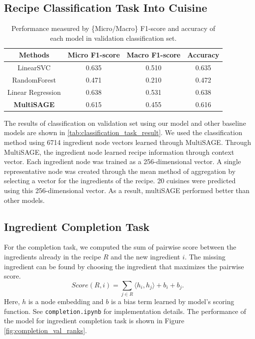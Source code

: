  \subsection{Recipe Classification Task Into Cuisine}
 
 \begin{table}[btp!]
    \centering
    \begin{tabular}{ c c c c }
        \toprule
        \textbf{Methods} & \textbf{Micro F1-score} & \textbf{Macro F1-score} & \textbf{Accuracy} \\
        \midrule
        LinearSVC & 0.635 & 0.510 & 0.635 \\
        RandomForest & 0.471 & 0.210 & 0.472 \\
        Linear Regression & 0.638 & 0.531 & 0.638 \\
        \textbf{MultiSAGE} & 0.615 & 0.455 & 0.616 \\
        \bottomrule
        
    \end{tabular}
    \caption{\label{tab:classification_task_result} Performance measured by \{Micro/Macro\} F1-score and accuracy of each model in validation classification set.}

 \end{table}
 
  The results of classification on validation set using our model and other baseline models are shown in \autoref{tab:classification_task_result}.  
  We used the classification method using 6714 ingredient node vectors learned through MultiSAGE. Through MultiSAGE, the ingredient node learned recipe information through context vector. Each ingredient node was trained as a 256-dimensional vector. A single representative node was created through the mean method of aggregation by selecting a vector for the ingredients of the recipe. 20 cuisines were predicted using this 256-dimensional vector. As a result, multiSAGE performed better than other models.
  
 \subsection{Ingredient Completion Task}
 For the completion task, we computed the sum of pairwise score between the ingredients already in the recipe $R$ and the new ingredient $i$. The missing ingredient can be found by choosing the ingredient that maximizes the pairwise score.
 \begin{equation}
     Score(R, i) = \sum_{j \in R} \langle h_i, h_j \rangle + b_i + b_j.
 \end{equation}
 Here, $h$ is a node embedding and $b$ is a bias term learned by model's scoring function. See \texttt{completion.ipynb} for implementation details. The performance of the model for ingredient completion task is shown in Figure \autoref{fig:completion_val_ranks}.

